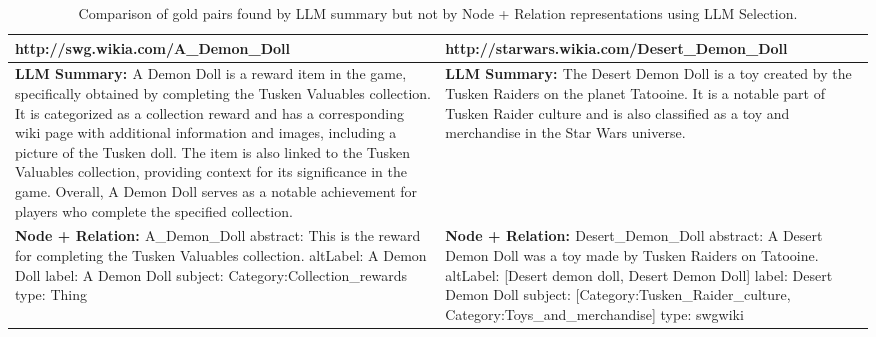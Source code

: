 \documentclass[11pt]{article}
\newcommand{\cmark}{\textcolor{green}{\ding{51}}} %
\newcommand{\xmark}{\textcolor{red}{\ding{55}}}
\begin{document}
\begin{table*}[h!]
\footnotesize
\centering
\begin{tabular}{|p{7cm}|p{7cm}|}
\hline
\textbf{http://swg.wikia.com/A\_Demon\_Doll} & 
\textbf{http://starwars.wikia.com/Desert\_Demon\_Doll} \\
\hline

\textbf{LLM Summary: \cmark} \newline
A Demon Doll is a reward item in the game, specifically obtained by completing the Tusken Valuables collection. It is categorized as a collection reward and has a corresponding wiki page with additional information and images, including a picture of the Tusken doll. The item is also linked to the Tusken Valuables collection, providing context for its significance in the game. Overall, A Demon Doll serves as a notable achievement for players who complete the specified collection. &

\textbf{LLM Summary: \cmark} \newline
The Desert Demon Doll is a toy created by the Tusken Raiders on the planet Tatooine. It is a notable part of Tusken Raider culture and is also classified as a toy and merchandise in the Star Wars universe. \\
\hline

\textbf{Node + Relation: \xmark} \newline
A\_Demon\_Doll \newline
abstract: This is the reward for completing the Tusken Valuables collection. \newline
altLabel: A Demon Doll \newline
label: A Demon Doll \newline
subject: Category:Collection\_rewards \newline
type: Thing &

\textbf{Node + Relation: \xmark} \newline
Desert\_Demon\_Doll \newline
abstract: A Desert Demon Doll was a toy made by Tusken Raiders on Tatooine. \newline
altLabel: [Desert demon doll, Desert Demon Doll] \newline
label: Desert Demon Doll \newline
subject: [Category:Tusken\_Raider\_culture, Category:Toys\_and\_merchandise] \newline
type: swgwiki \\
\hline
\end{tabular}
\caption{Comparison of gold pairs found by LLM summary but not by Node + Relation representations using LLM Selection.}
\label{tab:example-comparison}
\end{table*}
\end{document}
